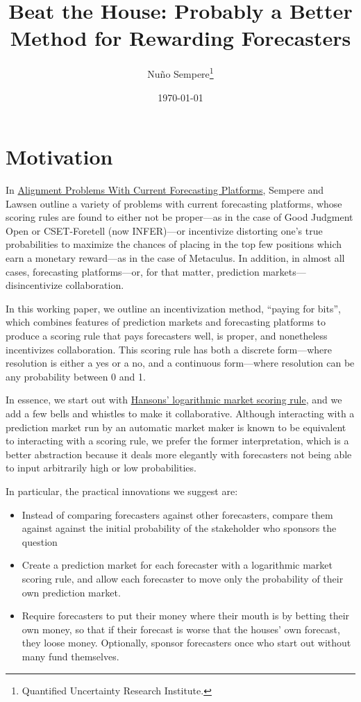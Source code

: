\documentclass[]{article}
\title{Beat the House: Probably a Better Method for Rewarding Forecasters}
\author{Nuño Sempere\footnote{Quantified Uncertainty Research Institute.}}
\date{\today}
\providecommand{\tightlist}{%
  \setlength{\itemsep}{0pt}\setlength{\parskip}{0pt}}
\begin{document}
\maketitle

\hypertarget{motivation}{%
\section{Motivation}\label{motivation}}

In \href{https://arxiv.org/abs/2106.11248}{Alignment Problems With
Current Forecasting Platforms}, Sempere and Lawsen outline a variety of
problems with current forecasting platforms, whose scoring rules are
found to either not be proper---as in the case of Good Judgment Open or
CSET-Foretell (now INFER)---or incentivize distorting one's true
probabilities to maximize the chances of placing in the top few
positions which earn a monetary reward---as in the case of Metaculus. In
addition, in almost all cases, forecasting platforms---or, for that
matter, prediction markets---disincentivize collaboration.

In this working paper, we outline an incentivization method, ``paying
for bits'', which combines features of prediction markets and
forecasting platforms to produce a scoring rule that pays forecasters
well, is proper, and nonetheless incentivizes collaboration. This
scoring rule has both a discrete form---where resolution is either a yes
or a no, and a continuous form---where resolution can be any probability
between 0 and 1.

In essence, we start out with
\href{https://mason.gmu.edu/~rhanson/mktscore.pdf}{Hansons' logarithmic
market scoring rule}, and we add a few bells and whistles to make it
collaborative. Although interacting with a prediction market run by an
automatic market maker is known to be equivalent to interacting with a
scoring rule, we prefer the former interpretation, which is a better
abstraction because it deals more elegantly with forecasters not being
able to input arbitrarily high or low probabilities.

In particular, the practical innovations we suggest are:

\begin{itemize}
\tightlist
\item
  Instead of comparing forecasters against other forecasters, compare
  them against against the initial probability of the stakeholder who
  sponsors the question
\item
  Create a prediction market for each forecaster with a logarithmic
  market scoring rule, and allow each forecaster to move only the
  probability of their own prediction market.
\item
  Require forecasters to put their money where their mouth is by betting
  their own money, so that if their forecast is worse that the houses'
  own forecast, they loose money. Optionally, sponsor forecasters once
  who start out without many fund themselves.
\end{itemize}
\end{document}
